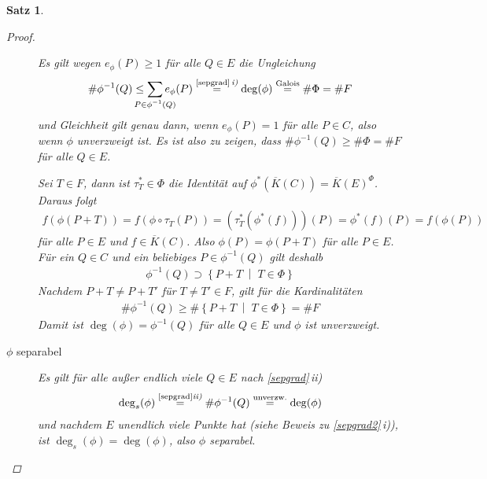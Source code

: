 \documentclass[english, german, parskip=half]{scrartcl}
\newtheorem{Satz}{Satz}[section]
\theoremstyle{definition}
\theoremstyle{remark}
\newcommand*{\algK}{\ensuremath{\overline K}} %
\newcommand*{\degs}{\operatorname{\deg}_s} %
\newcommand{\F}{F} %
\begin{document}
\begin{Satz}
\begin{proof}
\begin{description}
      Es gilt wegen $e_\phi(P)\geq1$ für alle $Q\in E$ die Ungleichung
      \begin{gather*}
        \#\phi^{-1}(Q)
        \leq
        \sum_{\mathclap{P\in\phi^{-1}(Q)}} e_\phi(P)
        \overset{\text{\autoref{sepgrad}\,\emph{i)}}}{=}
        \deg(\phi)
        \overset{\text{Galois}}{=}
        \#\Phi
        =\# \F
      \end{gather*}
      und Gleichheit gilt genau dann, wenn $e_\phi(P)=1$ für alle
      $P\in C$, also wenn $\phi$ unverzweigt ist.
      Es ist also zu zeigen, dass $\#\phi^{-1}(Q)\geq\#\Phi=\# \F$ für alle 
      $Q\in E$.

      Sei $T\in\F$, dann ist $\tau_T^*\in\Phi$ die Identität auf
      $\phi^*(\algK(C))=\algK(E)^\Phi$. Daraus folgt
      \begin{gather*}
        f(\phi(P+T))
        = f(\phi\circ\tau_T(P)) 
        = \left( \tau_T^*(\phi^*(f)) \right)(P)
        = \phi^*(f)(P)
        = f(\phi(P))
      \end{gather*}
      für alle $P\in E$ und $f\in\algK(C)$.
      Also $\phi(P) = \phi(P+T)$ für alle $P\in E$.
      Für ein $Q\in C$ und ein beliebiges $P\in\phi^{-1}(Q)$ gilt
      deshalb
      \begin{gather*}
        \phi^{-1}(Q) 
        \supset \left\{ P+T \;\middle|\; T\in\Phi \right\}        
      \end{gather*}
      Nachdem $P+T\neq P+T'$ für $T\neq T'\in\F$, gilt für die
      Kardinalitäten
      \begin{gather*}
        \#\phi^{-1}(Q) 
        \geq \#\left\{ P+T \;\middle|\; T\in\Phi \right\}
        = \#\F
      \end{gather*}
      Damit ist $\deg(\phi)=\phi^{-1}(Q)$ für alle $Q\in E$ und
      $\phi$ ist unverzweigt.

    \item[$\phi$ separabel]
      Es gilt für alle außer endlich viele $Q\in E$ nach
      \autoref{sepgrad}\,\emph{ii)}
      \begin{gather*}
        \degs(\phi) 
        \overset{\text{\autoref{sepgrad}\emph{ii)}}}{=}
        \#\phi^{-1}(Q) 
        \overset{\text{unverzw.}}{=} 
          \deg(\phi)
      \end{gather*}
      und nachdem $E$ unendlich viele Punkte hat (siehe Beweis zu
      \autoref{sepgrad2}\,\emph{i)}), ist $\degs(\phi)=\deg(\phi)$, also
      $\phi$ separabel.
    \end{description}
    

\end{proof}
\end{Satz}
\end{document}
